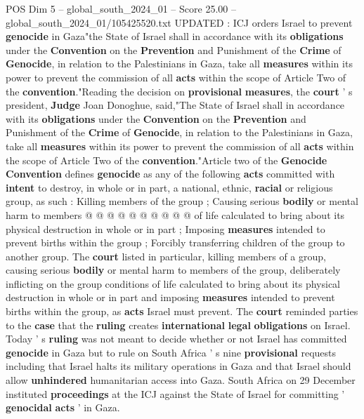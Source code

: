 \begin{textsample}{POS Dim 5 – global\_south\_2024\_01 – Score 25.00 – global\_south\_2024\_01/105425520.txt}  \label{ex:f5_pos_002}
UPDATED : ICJ orders Israel to prevent \textbf{genocide} in Gaza"the State of Israel shall in accordance with its \textbf{obligations} under the \textbf{Convention} on the \textbf{Prevention} and Punishment of the \textbf{Crime} of \textbf{Genocide}, in relation to the Palestinians in Gaza, take all \textbf{measures} within its power to prevent the commission of all \textbf{acts} within the scope of Article Two of the \textbf{convention}."Reading the decision on \textbf{provisional} \textbf{measures}, the \textbf{court} ' s president, \textbf{Judge} Joan Donoghue, said,"The State of Israel shall in accordance with its \textbf{obligations} under the \textbf{Convention} on the \textbf{Prevention} and Punishment of the \textbf{Crime} of \textbf{Genocide}, in relation to the Palestinians in Gaza, take all \textbf{measures} within its power to prevent the commission of all \textbf{acts} within the scope of Article Two of the \textbf{convention}."Article two of the \textbf{Genocide} \textbf{Convention} defines \textbf{genocide} as any of the following \textbf{acts} committed with \textbf{intent} to destroy, in whole or in part, a national, ethnic, \textbf{racial} or religious group, as such : Killing members of the group ; Causing serious \textbf{bodily} or mental harm to members @ @ @ @ @ @ @ @ @ @ of life calculated to bring about its physical destruction in whole or in part ; Imposing \textbf{measures} intended to prevent births within the group ; Forcibly transferring children of the group to another group.
The \textbf{court} listed in particular, killing members of a group, causing serious \textbf{bodily} or mental harm to members of the group, deliberately inflicting on the group conditions of life calculated to bring about its physical destruction in whole or in part and imposing \textbf{measures} intended to prevent births within the group, as \textbf{acts} Israel must prevent.
The \textbf{court} reminded parties to the \textbf{case} that the \textbf{ruling} creates \textbf{international} \textbf{legal} \textbf{obligations} on Israel.
Today ' s \textbf{ruling} was not meant to decide whether or not Israel has committed \textbf{genocide} in Gaza but to rule on South Africa ' s nine \textbf{provisional} requests including that Israel halts its military operations in Gaza and that Israel should allow \textbf{unhindered} humanitarian access into Gaza.
South Africa on 29 December instituted \textbf{proceedings} at the ICJ against the State of Israel for committing ' \textbf{genocidal} \textbf{acts} ' in Gaza.

\end{textsample}
